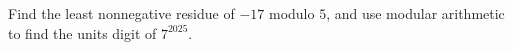 Find the least nonnegative residue of $-17$ modulo $5$, and use modular arithmetic to find the units digit of $7^{2025}$.
